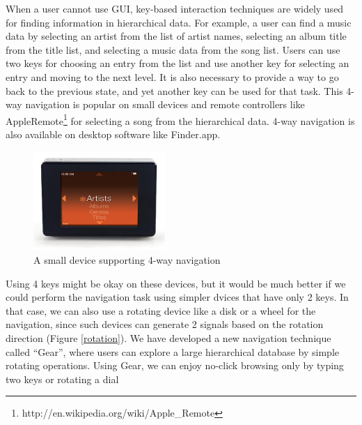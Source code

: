 \documentclass{article}
\begin{document}
% 



When a user cannot use GUI, key-based interaction techniques are widely used for
finding information in hierarchical data.
%
For example, a user can find a music data by
selecting an artist from the list of artist names,
selecting an album title from the title list,
and selecting a music data from the song list.
%
Users can use two keys for choosing an entry from the list
and use another key for selecting an entry and moving to the next level.
It is also necessary to provide a way to go back to the previous state, and
yet another key can be used for that task.
This 4-way navigation is popular on small devices
and remote controllers like AppleRemote\footnote{\textsf{http://en.wikipedia.org/wiki/Apple\_Remote}}
for selecting a song from the hierarchical data.
4-way navigation is also available on desktop software like Finder.app.

\begin{figure}[H]
\centerline{\includegraphics[width=50mm,bb=0 0 333 250]{figures/0048a5e91ddcf1d5670bd958e3c55619.jpg}}
\caption{A small device supporting 4-way navigation}
\label{rio}
\end{figure}

Using 4 keys might be okay on these devices, but it would be much better
if we could perform the navigation task using simpler dvices that have only 2 keys.
In that case, we can also use a rotating device like a disk or a wheel for the navigation,
since such devices can generate 2 signals based on the rotation direction (Figure \ref{rotation}).
%
%
We have developed a new navigation technique called ``{Gear}'',
where users can explore a large hierarchical database by simple rotating operations.
%
Using Gear, we can enjoy no-click browsing only by typing two keys or
rotating a dial
\end{document}
